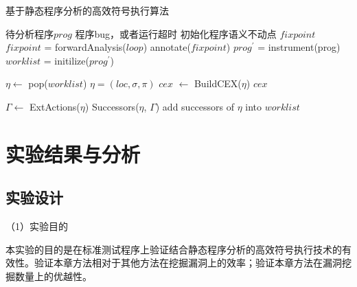 \begin{algorithm}[h]
\renewcommand{\algorithmicrequire}{\textbf{Input:}}
\renewcommand{\algorithmicensure}{\textbf{Output:}}
\caption{基于静态程序分析的高效符号执行算法}
\label{algo-absint-symexe}
\begin{algorithmic}[1]
\REQUIRE 待分析程序$prog$
\ENSURE 程序bug，或者运行超时
\STATE 初始化程序语义不动点 $fixpoint$
	\STATE $fixpoint$ = forwardAnalysis($loop$)
	\STATE annotate($fixpoint$)
\ENDFOR
\STATE $prog^{'}$ = instrument(prog)
\STATE $worklist$ = initilize($prog^{'}$)

{}
	\STATE $\eta \gets $ pop($worklist$)
		\STATE $\eta = (loc, \sigma, \pi)$
			\STATE $\mathit{cex}$ $\gets$ BuildCEX($\eta$)
			\RETURN $\mathit{cex}$
		\ENDIF
	
	\ELSE
		\STATE $\Gamma \gets $ ExtActions($\eta$)
		\STATE Successors($\eta$, $\Gamma$)
		\STATE add successors of $\eta$ into $worklist$
	\ENDIF
\ENDWHILE
\end{algorithmic}
\end{algorithm}


%



\section{实验结果与分析}
\label{sec-experiment}

\subsection{实验设计}

（1）实验目的

本实验的目的是在标准测试程序上验证结合静态程序分析的高效符号执行技术的有效性。验证本章方法相对于其他方法在挖掘漏洞上的效率；验证本章方法在漏洞挖掘数量上的优越性。

